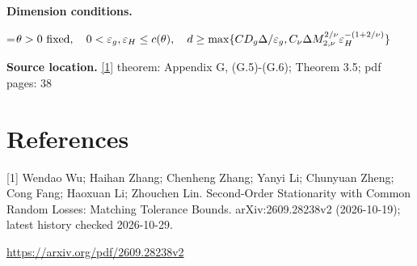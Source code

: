 \documentclass[10pt,a4paper]{article}
\newcommand{\AtlasMath}[1]{\par\begingroup\centering\setbox0=\hbox{$\displaystyle #1$}\ifdim\wd0>1.4\linewidth\typeout{ATLAS WIDE FORMULA: \the\wd0}\fi\ifdim\wd0>\linewidth\resizebox{\linewidth}{!}{\box0}\else\box0\fi\par\endgroup}
\begin{document}
\textbf{Dimension conditions.} 
\AtlasMath{\theta>0\ {\rm fixed},\quad0<\varepsilon_g,\varepsilon_H\le c(\theta),\quad d\ge\max\{C D_g\Delta/\varepsilon_g,C_\nu\Delta M_{2,\nu}^{2/\nu}\varepsilon_H^{-(1+2/\nu)}\}}


\textbf{Source location.} \href{https://arxiv.org/pdf/2609.28238v2}{[1]} theorem: Appendix G, (G.5)-(G.6); Theorem 3.5; pdf pages: 38

\section{References}
[1] Wendao Wu; Haihan Zhang; Chenheng Zhang; Yanyi Li; Chunyuan Zheng; Cong Fang; Haoxuan Li; Zhouchen Lin. Second-Order Stationarity with Common Random Losses: Matching Tolerance Bounds. arXiv:2609.28238v2 (2026-10-19); latest history checked 2026-10-29.

\url{https://arxiv.org/pdf/2609.28238v2}
\end{document}
